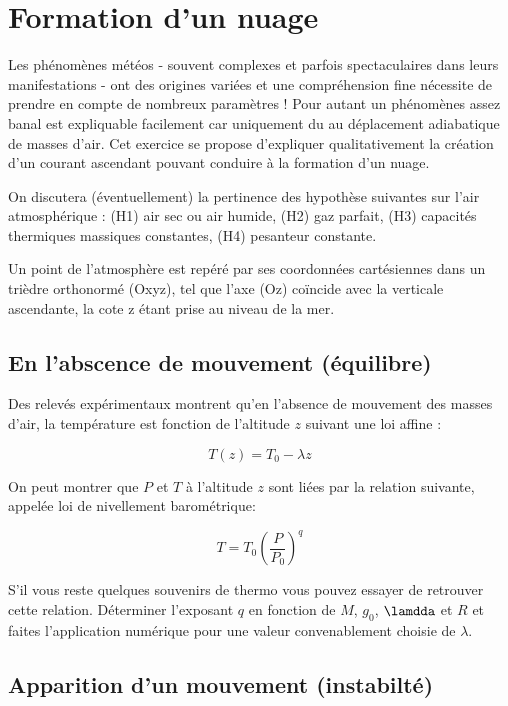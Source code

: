\documentclass[letterpaper]{article}
\begin{document}
\newpage



\section{Formation d'un nuage}
\label{sec:orgb0553e2}


Les phénomènes météos - souvent complexes et parfois spectaculaires dans leurs manifestations - ont des origines variées et une compréhension fine nécessite de prendre en compte de nombreux paramètres ! Pour autant un phénomènes assez banal est expliquable facilement car uniquement du au déplacement adiabatique de masses d’air. Cet exercice se propose d’expliquer qualitativement la création d’un courant ascendant  pouvant conduire à la formation d'un nuage.

On discutera (éventuellement) la pertinence des hypothèse suivantes sur l'air atmosphérique : (H1) air sec ou air humide, (H2) gaz parfait, (H3) capacités thermiques massiques constantes, (H4) pesanteur constante.

Un point de l'atmosphère est repéré par ses coordonnées cartésiennes dans un trièdre orthonormé (Oxyz), tel que l'axe (Oz) coïncide avec la verticale ascendante, la cote z étant prise au niveau de la mer.


\subsection{En l'abscence de mouvement (équilibre)}
\label{sec:org6426722}

Des relevés expérimentaux montrent qu'en l'absence de mouvement des masses d'air, la température est fonction de l'altitude \(z\) suivant une loi affine : 

$$ T(z) = T_{0} - \lambda z $$

On peut montrer que \(P\) et \(T\) à l'altitude \(z\) sont liées par la relation suivante, appelée loi de nivellement barométrique:

$$ T =T_0 \left( \frac{P}{P_0}  \right)^{q} $$

S'il vous reste quelques souvenirs de thermo vous pouvez essayer de retrouver cette relation. Déterminer l’exposant \(q\) en fonction de \(M\), \(g_0\), \(\lamdda\) et \(R\) et faites l'application numérique pour une valeur convenablement choisie de \(\lambda\).




\subsection{Apparition d'un mouvement (instabilté)}
\label{sec:org3d0ae25}
\end{document}
